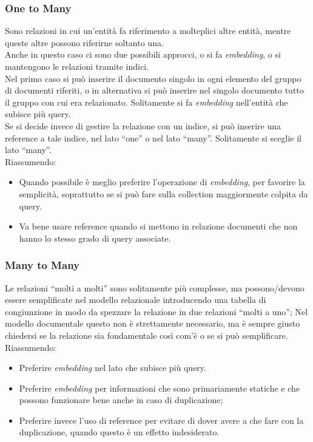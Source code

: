 \subsubsection{One to Many}
Sono relazioni in cui un'entità fa riferimento a molteplici altre entità, mentre queste altre possono riferirne soltanto una.\\
Anche in questo caso ci sono due possibili approcci, o si fa \textit{embedding}, o si mantengono le relazioni tramite indici.\\
Nel primo caso si può inserire il documento singolo in ogni elemento del gruppo di documenti riferiti, o in alternativa si può inserire nel singolo documento tutto il gruppo con cui era relazionato. Solitamente si fa \textit{embedding} nell'entità che subisce più query.\\
Se si decide invece di gestire la relazione con un indice, si può inserire una reference a tale indice, nel lato ``one'' o nel lato ``many''. Solitamente si sceglie il lato ``many''.\\
Riassumendo:
\begin{itemize}
    \item Quando possibile è meglio preferire l'operazione di \textit{embedding}, per favorire la semplicità, soprattutto se si può fare sulla collection maggiormente colpita da query.
    \item Va bene usare reference quando si mettono in relazione documenti che non hanno lo stesso grado di query associate.
\end{itemize}

\subsubsection{Many to Many}
Le relazioni ``molti a molti'' sono solitamente più complesse, ma possono/devono essere semplificate nel modello relazionale introducendo una tabella di congiunzione in modo da spezzare la relazione in due relazioni ``molti a uno'';
Nel modello documentale questo non è strettamente necessario, ma è sempre giusto chiedersi se la relazione sia fondamentale così com'è o se si può semplificare.
Riassumendo:
\begin{itemize}
    \item Preferire \textit{embedding} nel lato che subisce più query.
    \item Preferire \textit{embedding} per informazioni che sono primariamente statiche e che possono funzionare bene anche in caso di duplicazione;
    \item Preferire invece l'uso di reference per evitare di dover avere a che fare con la duplicazione, quando questo è un effetto indesiderato.
\end{itemize}

